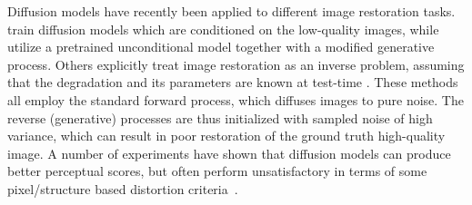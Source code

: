 \documentclass{article}
\theoremstyle{plain}
\theoremstyle{definition}
\theoremstyle{remark}
\begin{document}
Diffusion models have recently been applied to different image restoration tasks. \citet{saharia2022image, saharia2022palette} train diffusion models which are conditioned on the low-quality images, while \citet{lugmayr2022repaint} utilize a pretrained unconditional model together with a modified generative process. Others explicitly treat image restoration as an inverse problem, assuming that the degradation and its parameters are known at test-time \citep{kawar2021snips, chung2022diffusion, kawar2022denoising}. These methods all employ the standard forward process, which diffuses images to pure noise. The reverse (generative) processes are thus initialized with sampled noise of high variance, which can result in poor restoration of the ground truth high-quality image. A number of experiments have shown that diffusion models can produce better perceptual scores, but often perform unsatisfactory in terms of some pixel/structure based distortion criteria~\citep{saharia2022image, li2022srdiff, kawar2021snips}.
\end{document}
